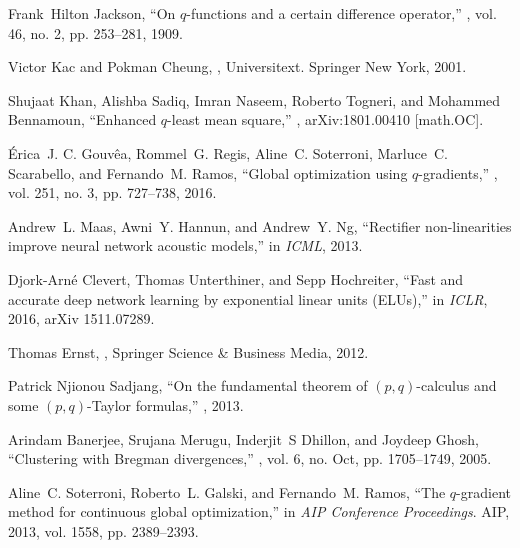 \documentclass{article}
\begin{document}
\begin{thebibliography}{10}

Frank~Hilton Jackson,
\newblock ``On $q$-functions and a certain difference operator,''
, vol. 46, no. 2, pp. 253--281, 1909.

Victor Kac and Pokman Cheung,
,
\newblock Universitext. Springer New York, 2001.

Shujaat Khan, Alishba Sadiq, Imran Naseem, Roberto Togneri, and Mohammed
  Bennamoun,
\newblock ``Enhanced $q$-least mean square,''
,
\newblock arXiv:1801.00410 [math.OC].

{\'E}rica~J. C. Gouv{\^e}a, Rommel~G. Regis, Aline~C. Soterroni, Marluce~C.
  Scarabello, and Fernando~M. Ramos,
\newblock ``Global optimization using $q$-gradients,''
, vol. 251, no. 3, pp.
  727--738, 2016.

Andrew~L. Maas, Awni~Y. Hannun, and Andrew~Y. Ng,
\newblock ``Rectifier non-linearities improve neural network acoustic models,''
\newblock in {\em ICML}, 2013.

Djork{-}Arn{\'{e}} Clevert, Thomas Unterthiner, and Sepp Hochreiter,
\newblock ``Fast and accurate deep network learning by exponential linear units
  ({ELU}s),''
\newblock in {\em ICLR}, 2016,
\newblock arXiv 1511.07289.

Thomas Ernst,
,
\newblock Springer Science \& Business Media, 2012.

Patrick Njionou Sadjang,
\newblock ``On the fundamental theorem of $(p,q)$-calculus and some $(p,
  q)$-{T}aylor formulas,''
, 2013.

Arindam Banerjee, Srujana Merugu, Inderjit~S Dhillon, and Joydeep Ghosh,
\newblock ``Clustering with {B}regman divergences,''
, vol. 6, no. Oct, pp.
  1705--1749, 2005.

Aline~C. Soterroni, Roberto~L. Galski, and Fernando~M. Ramos,
\newblock ``The $q$-gradient method for continuous global optimization,''
\newblock in {\em AIP Conference Proceedings}. AIP, 2013, vol. 1558, pp.
  2389--2393.
	

\end{thebibliography}
\end{document}
